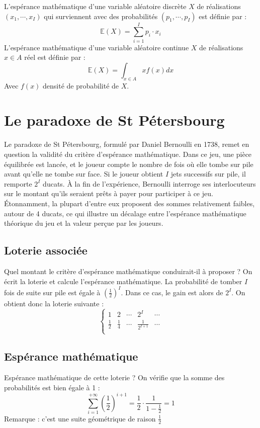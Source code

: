 \documentclass[a4paper, 12pt]{report}
\begin{document}
L'espérance mathématique d'une variable aléatoire discrète $X$ de réalisations $(x_1,\cdots,x_I)$ qui surviennent avec des probabilités $(p_1,\cdots,p_I)$ est définie par :
$$
\mathbb{E}(X)=\sum_{i=1}^{I}p_i\cdot x_i
$$
L'espérance mathématique d'une variable aléatoire continue $X$ de réalisations $x \in A$ réel est définie par :
$$
\mathbb{E}(X)=\int_{x \in A}^{}xf(x)dx
$$
Avec $f(x)$ densité de probabilité de $X$.

\section{Le paradoxe de St Pétersbourg}

Le paradoxe de St Pétersbourg, formulé par Daniel Bernoulli en 1738, remet en question la validité du critère d'espérance mathématique. Dans ce jeu, une pièce équilibrée est lancée, et le joueur compte le nombre de fois où elle tombe sur pile avant qu'elle ne tombe sur face. Si le joueur obtient $I$ jets successifs sur pile, il remporte $2^{I}$ ducats. À la fin de l'expérience, Bernoulli interroge ses interlocuteurs sur le montant qu'ils seraient prêts à payer pour participer à ce jeu. Étonnamment, la plupart d'entre eux proposent des sommes relativement faibles, autour de 4 ducats, ce qui illustre un décalage entre l'espérance mathématique théorique du jeu et la valeur perçue par les joueurs.

\subsection{Loterie associée}

Quel montant le critère d'espérance mathématique conduirait-il à proposer ?
On écrit la loterie et calcule l'espérance mathématique. La probabilité de tomber $I$ fois de suite sur pile est égale à $(\frac{1}{2})^I$. Dans ce cas, le gain est alors de $2^I$. On obtient donc la loterie suivante :
$$
 \left\{\begin{matrix}
	1 & 2 & \cdots & 2^{I} & \cdots \\
	\frac{1}{2} &  \frac{1}{4}  & \cdots &  \frac{1}{2^{I+1}} & \cdots \\
\end{matrix}\right.
$$
\subsection{Espérance mathématique}

Espérance mathématique de cette loterie ? On vérifie que la somme des probabilités est bien égale à 1 :
$$
\sum_{i=1}^{+\infty}\left(\frac{1}{2}\right)^{i+1}=\frac{1}{2}\cdot\frac{1}{1-\frac{1}{2}}=1
$$
Remarque : c'est une suite géométrique de raison $\frac{1}{2}$
\end{document}
